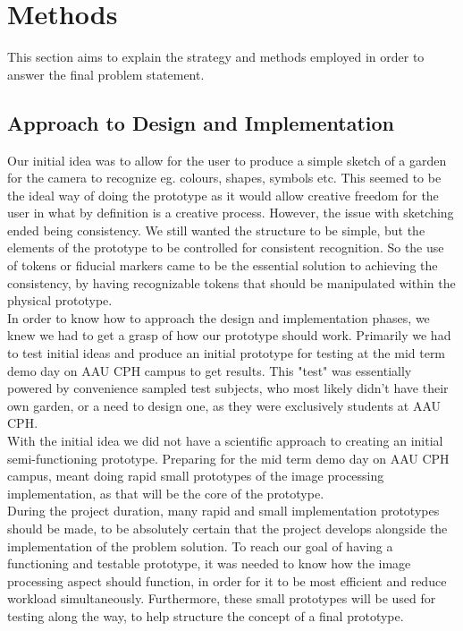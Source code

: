\chapter{Methods}
This section aims to explain the strategy and methods employed in order to answer the final problem statement. 

\section{Approach to Design and Implementation}

Our initial idea was to allow for the user to produce a simple sketch of a garden for the camera to recognize eg. colours, shapes, symbols etc. This seemed to be the ideal way of doing the prototype as it would allow creative freedom for the user in what by definition is a creative process. However, the issue with sketching ended being consistency. We still wanted the structure to be simple, but the elements of the prototype to be controlled for consistent recognition. So the use of tokens or fiducial markers came to be the essential solution to achieving the consistency, by having recognizable tokens that should be manipulated within the physical prototype.\\


In order to know how to approach the design and implementation phases, we knew we had to get a grasp of how our prototype should work. Primarily we had to test initial ideas and produce an initial prototype for testing at the mid term demo day on AAU CPH campus to get results. This "test" was essentially powered by convenience sampled test subjects, who most likely didn't have their own garden, or a need to design one, as they were exclusively students at AAU CPH. \\

With the initial idea we did not have a scientific approach to creating an initial semi-functioning prototype. Preparing for the mid term demo day on AAU CPH campus, meant doing rapid small prototypes of the image processing implementation, as that will be the core of the prototype.\\


During the project duration, many rapid and small implementation prototypes should be made, to be absolutely certain that the project develops alongside the implementation of the problem solution.
To reach our goal of having a functioning and testable prototype, it was needed to know how the image processing aspect should function, in order for it to be most efficient and reduce workload simultaneously. Furthermore, these small prototypes will be used for testing along the way, to help structure the concept of a final prototype.\\


